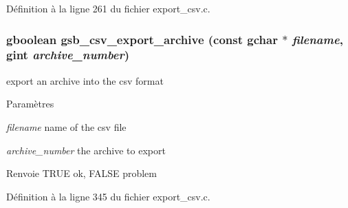 Définition à la ligne 261 du fichier export\_\-csv.c.

\subsubsection[{gsb\_\-csv\_\-export\_\-archive}]{\setlength{\rightskip}{0pt plus 5cm}gboolean gsb\_\-csv\_\-export\_\-archive (const gchar $\ast$ {\em filename}, \/  gint {\em archive\_\-number})}\label{export__csv_8h_a96e088f5208d8fcd8dae087fdc9f5028}
export an archive into the csv format


\begin{DoxyParams}{Paramètres}
\item[{\em filename}]name of the csv file \item[{\em archive\_\-number}]the archive to export\end{DoxyParams}
\begin{DoxyReturn}{Renvoie}
TRUE ok, FALSE problem 
\end{DoxyReturn}


Définition à la ligne 345 du fichier export\_\-csv.c.

